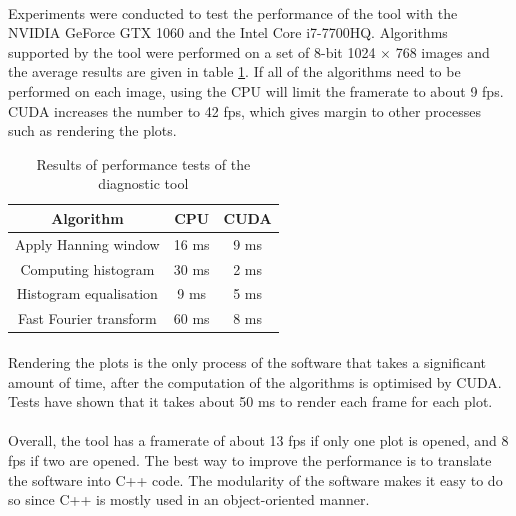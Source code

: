 \documentclass[12pt, twocolumn]{report}
\begin{document}
\paragraph{}
Experiments were conducted to test the performance of the tool with the NVIDIA GeForce GTX 1060 and the Intel Core i7-7700HQ. Algorithms supported by the tool were performed on a set of 8-bit 1024 $\times$ 768 images and the average results are given in table \ref{Software performance test}. If all of the algorithms need to be performed on each image, using the CPU will limit the framerate to about 9 fps. CUDA increases the number to 42 fps, which gives margin to other processes such as rendering the plots.

\begin{table}[htbp]
    \caption{Results of performance tests of the diagnostic tool}
    \begin{center}
    \begin{tabular}{|c|c|c|}
    \hline
    \textbf{Algorithm} & \textbf{CPU} & \textbf{CUDA} \\
    \hline
    Apply Hanning window & 16 ms & 9 ms \\
    \hline
    Computing histogram & 30 ms & 2 ms \\
    \hline
    Histogram equalisation & 9 ms & 5 ms \\
    \hline
    Fast Fourier transform & 60 ms & 8 ms \\
    \hline
    \end{tabular}
    \label{Software performance test}
    \end{center}
\end{table}

\paragraph{}
Rendering the plots is the only process of the software that takes a significant amount of time, after the computation of the algorithms is optimised by CUDA. Tests have shown that it takes about 50 ms to render each frame for each plot.

\paragraph{}
Overall, the tool has a framerate of about 13 fps if only one plot is opened, and 8 fps if two are opened. The best way to improve the performance is to translate the software into C++ code. The modularity of the software makes it easy to do so since C++ is mostly used in an object-oriented manner.
\end{document}
